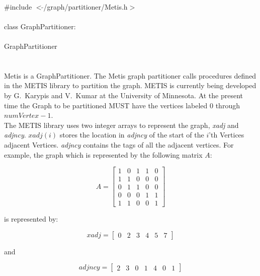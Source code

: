 
   \\
\indent \#include $<\tilde{ }$/graph/partitioner/Metis.h$>$  \\

  \\
\indent class GraphPartitioner:  \\

 \\
\indent GraphPartitioner \\
\indent{} \\

  \\
\indent Metis is a GraphPartitioner. The Metis graph partitioner calls
procedures defined in the METIS library to partition the graph. METIS
is currently being developed by G.~Karypis and V.~Kumar at the
University of Minnesota. At the present time the Graph to be
partitioned MUST have the vertices labeled $0$ through $numVertex-1$. \\

The METIS library uses two integer arrays to represent the graph, {\em
xadj} and {\em adjncy}. $xadj(i)$ stores the location in {\em adjncy}
of the start of the $i$'th Vertices adjacent Vertices. {\em adjncy}
contains the tags of all the adjacent vertices. For example, the graph
which is represented by the following matrix $A$:


$$ A =
\left[
\begin{array}{ccccc}
1 & 0 & 1 & 1 & 0  \\
1 & 1 & 0 & 0 & 0  \\
0 & 1 & 1 & 0 & 0 \\
0 & 0 & 0 & 1 & 1 \\
1 & 1 & 0 & 0 & 1
\end{array}
\right] 
$$

is represented by:

$$
xadj =
\left[
\begin{array}{cccccccccccccc}
0 & 2 & 3 & 4 & 5 & 7
\end{array}
\right] 
$$

and

$$
adjncy =
\left[
\begin{array}{cccccccccccccc}
2 & 3 & 0 & 1 & 4 & 0 & 1
\end{array}
\right] 
$$


